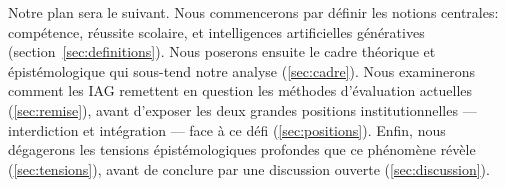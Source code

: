 Notre plan sera le suivant. 
Nous commencerons par d\'efinir les notions centrales: comp\'etence, r\'eussite scolaire, et intelligences artificielles g\'en\'eratives (section~\ref{sec:definitions}).  %
Nous poserons ensuite le cadre th\'eorique et \'epist\'emologique qui sous-tend notre analyse (\ref{sec:cadre}). 
Nous examinerons comment les IAG remettent en question les m\'ethodes d'\'evaluation actuelles (\ref{sec:remise}), avant d'exposer les deux grandes positions institutionnelles --- interdiction et int\'egration --- face \`a ce d\'efi (\ref{sec:positions}). 
Enfin, nous d\'egagerons les tensions \'epist\'emologiques profondes que ce ph\'enom\`ene r\'ev\`ele (\ref{sec:tensions}), avant de conclure par une discussion ouverte (\ref{sec:discussion}).
